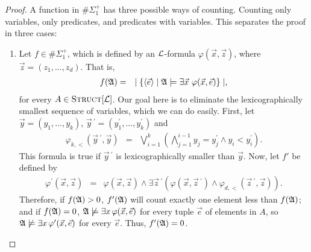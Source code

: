 \documentclass[12pt]{article}
\def\A{{\frak A}}
\def\L{{\cal L}}
\def\e{\vec{e}}
\def\x{\vec{x}}
\def\y{\vec{y}}
\def\z{\vec{z}}
\begin{document}
\begin{proof}
A function in $\#\Sigma_1^+$ has three possible ways of counting. Counting only variables, only predicates, and predicates with variables. This separates the proof in three cases:
\begin{enumerate}


\item Let $f \in \#\Sigma_1^+$, which is defined by an $\L$-formula $\varphi(\x,\z)$, where $\z = (z_1,...,z_d)$. That is,
\begin{eqnarray*}
f(\A) &=& \mid \{ \langle\e\rangle \mid \A \models \exists \x \ \varphi(\x,\e) \} \mid,
\end{eqnarray*}
for every $A \in \textsc{Struct}[\L]$. Our goal here is to eliminate the lexicographically smallest sequence of variables, which we can do easily. First, let $\y = (y_1,...,y_k)$, $\y\,^\prime = (y_1^\prime,...,y_k^\prime)$ and
\begin{eqnarray*}
\varphi_{k,<}(\y\,^\prime,\y) &=& \bigvee_{i = 1}^k \left( \bigwedge_{j=1}^{i-1} y_j = y_j^\prime \wedge y_i < y_i^\prime \right).
\end{eqnarray*}
This formula is true if $\y\,^\prime$ is lexicographically smaller than $\y$. Now, let $f'$ be defined by
\begin{eqnarray*}
\varphi^\prime(\x,\z) &=& \varphi(\x,\z) \wedge \exists \z\,^\prime (\varphi(\x,\z\,^\prime) \wedge \varphi_{d,<}(\z\,^\prime,\z ) ).
\end{eqnarray*}
Therefore, if $f(\A)>0$, $f'(\A)$ will count exactly one element less than $f(\A)$; and if $f(\A)=0$, $\A \not\models\exists x\,\varphi(\x,\e)$ for every tuple $\e$ of elements in $A$, so $\A \not\models\exists x\,\varphi^\prime(\x,\e)$ for every $\e$. Thus, $f'(\A)=0$.



\end{enumerate}
\end{proof}
\end{document}

